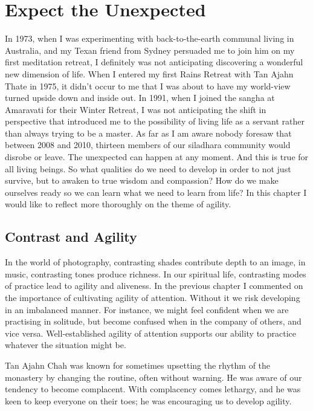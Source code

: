 \chapter{Expect the Unexpected}

In 1973, when I was experimenting with back-to-the-earth communal living
in Australia, and my Texan friend from Sydney persuaded me to join him
on my first meditation retreat, I definitely was not anticipating
discovering a wonderful new dimension of life. When I entered my first
Rains Retreat with Tan Ajahn Thate in 1975, it didn't occur to me that I
was about to have my world-view turned upside down and inside out. In
1991, when I joined the sangha at Amaravati for their Winter Retreat, I
was not anticipating the shift in perspective that introduced me to the
possibility of living life as a servant\cite{servant} rather than
always trying to be a master. As far as I am aware nobody foresaw that between 2008 and 2010, thirteen
members of our siladhara community would disrobe or leave. The
unexpected can happen at any moment. And this is true for all living
beings. So what qualities do we need to develop in order to not just
survive, but to awaken to true wisdom and compassion? How do we make
ourselves ready so we can learn what we need to learn from life? In this
chapter I would like to reflect more thoroughly on the theme of agility.

\section{Contrast and Agility}

In the world of photography, contrasting shades contribute depth to an
image, in music, contrasting tones produce richness. In our spiritual
life, contrasting modes of practice lead to agility and aliveness. In
the previous chapter I commented on the importance of cultivating
agility of attention. Without it we risk developing in an imbalanced
manner. For instance, we might feel confident when we are practising in
solitude, but become confused when in the company of others, and vice
versa. Well-established agility of attention supports our ability to
practice whatever the situation might be.

Tan Ajahn Chah was known for sometimes upsetting the rhythm of the
monastery by changing the routine, often without warning. He was aware
of our tendency to become complacent. With complacency comes lethargy,
and he was keen to keep everyone on their toes; he was encouraging us to
develop agility.


